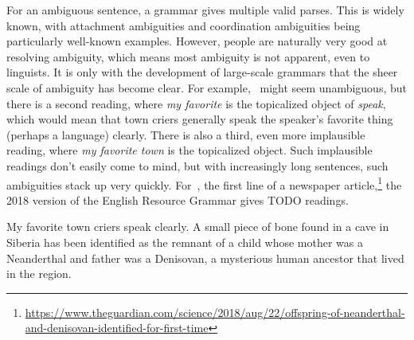 \documentclass[output=paper,nonflat]{langsci/langscibook}
\begin{document}
For an ambiguous sentence,
a grammar gives multiple valid parses.
This is widely known, with attachment ambiguities and coordination ambiguities
being particularly well-known examples.
However, people are naturally very good at resolving ambiguity,
which means most ambiguity is not apparent, even to linguists.
It is only with the development of large-scale grammars that the sheer scale of ambiguity has become clear.
For example, ~might seem unambiguous,
but there is a second reading, where \textit{my favorite} is the topicalized object of \textit{speak},
which would mean that town criers generally speak the speaker's favorite thing (perhaps a language) clearly.
There is also a third, even more implausible reading, where \textit{my favorite town} is the topicalized object.
Such implausible readings don't easily come to mind,
but with increasingly long sentences, such ambiguities stack up very quickly.
For~, the first line of a newspaper article,\footnote{%
	\url{https://www.theguardian.com/science/2018/aug/22/offspring-of-neanderthal-and-denisovan-identified-for-first-time}
}
the 2018 version of the English Resource Grammar \citep{Flickinger2000a,Flickinger2011a-u}
gives TODO readings.


\begin{exe}
\ex\label{cl:ex:ambig-simple}
My favorite town criers speak clearly.
\ex\label{cl:ex:ambig-many}
A small piece of bone found in a cave in Siberia has been identified
as the remnant of a child whose mother was a Neanderthal and father was a Denisovan,
a mysterious human ancestor that lived in the region.
\end{exe}
\end{document}
